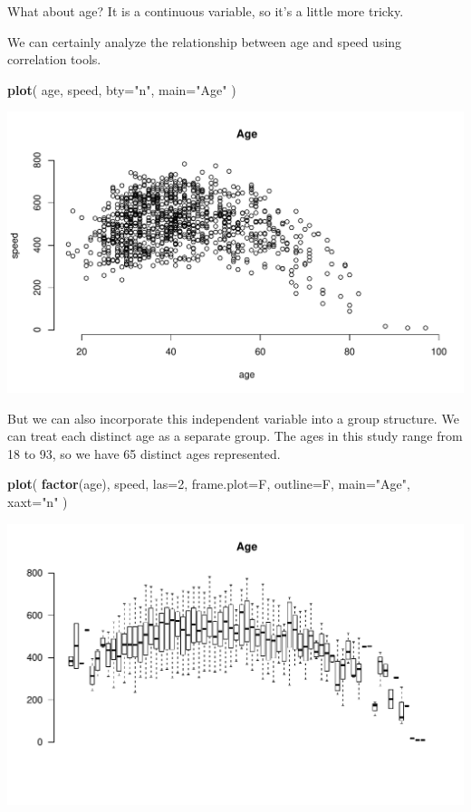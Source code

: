 \documentclass[]{book}
\newenvironment{Shaded}{\begin{snugshade}}{\end{snugshade}}
\newcommand{\DataTypeTok}[1]{\textcolor[rgb]{0.13,0.29,0.53}{#1}}
\newcommand{\DecValTok}[1]{\textcolor[rgb]{0.00,0.00,0.81}{#1}}
\newcommand{\KeywordTok}[1]{\textcolor[rgb]{0.13,0.29,0.53}{\textbf{#1}}}
\newcommand{\NormalTok}[1]{#1}
\newcommand{\StringTok}[1]{\textcolor[rgb]{0.31,0.60,0.02}{#1}}
\theoremstyle{definition}
\theoremstyle{definition}
\theoremstyle{definition}
\theoremstyle{remark}
\begin{document}
What about age? It is a continuous variable, so it's a little more
tricky.

We can certainly analyze the relationship between age and speed using
correlation tools.

\begin{Shaded}
\begin{Highlighting}[]
\KeywordTok{plot}\NormalTok{( age, speed, }\DataTypeTok{bty=}\StringTok{"n"}\NormalTok{, }\DataTypeTok{main=}\StringTok{"Age"}\NormalTok{ )}
\end{Highlighting}
\end{Shaded}

\begin{center}\includegraphics[width=0.7\linewidth]{DS4PS-I_files/figure-latex/unnamed-chunk-116-1} \end{center}

But we can also incorporate this independent variable into a group
structure. We can treat each distinct age as a separate group. The ages
in this study range from 18 to 93, so we have 65 distinct ages
represented.

\begin{Shaded}
\begin{Highlighting}[]

\KeywordTok{plot}\NormalTok{( }\KeywordTok{factor}\NormalTok{(age), speed, }\DataTypeTok{las=}\DecValTok{2}\NormalTok{, }\DataTypeTok{frame.plot=}\NormalTok{F, }\DataTypeTok{outline=}\NormalTok{F, }\DataTypeTok{main=}\StringTok{"Age"}\NormalTok{, }\DataTypeTok{xaxt=}\StringTok{"n"}\NormalTok{  )}
\end{Highlighting}
\end{Shaded}

\begin{center}\includegraphics[width=0.7\linewidth]{DS4PS-I_files/figure-latex/unnamed-chunk-117-1} \end{center}
\end{document}
